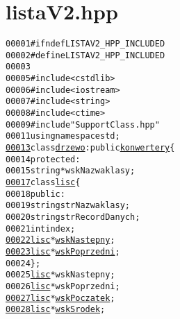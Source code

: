 \hypertarget{listaV2_8hpp_source}{
\section{listaV2.hpp}
}


\begin{footnotesize}\begin{alltt}
00001 \textcolor{preprocessor}{#ifndef LISTAV2\_HPP\_INCLUDED}
00002 \textcolor{preprocessor}{}\textcolor{preprocessor}{#define LISTAV2\_HPP\_INCLUDED}
00003 \textcolor{preprocessor}{}
00005 \textcolor{preprocessor}{#include <cstdlib>}
00006 \textcolor{preprocessor}{#include <iostream>}
00007 \textcolor{preprocessor}{#include <string>}
00008 \textcolor{preprocessor}{#include <ctime>}
00009 \textcolor{preprocessor}{#include "SupportClass.hpp"}
00011 \textcolor{keyword}{using namespace }std;
\hypertarget{listaV2_8hpp_source_l00013}{}\hyperlink{classdrzewo}{00013} \textcolor{keyword}{class }\hyperlink{classdrzewo}{drzewo}:\textcolor{keyword}{public} \hyperlink{classkonwertery}{konwertery}\{
00014     \textcolor{keyword}{protected}:
00015         \textcolor{keywordtype}{string} *wskNazwaklasy;
\hypertarget{listaV2_8hpp_source_l00017}{}\hyperlink{classdrzewo_1_1lisc}{00017}         \textcolor{keyword}{class }\hyperlink{classdrzewo_1_1lisc}{lisc}\{
00018             \textcolor{keyword}{public}:
00019                 \textcolor{keywordtype}{string} strNazwaklasy;
00020                 \textcolor{keywordtype}{string} strRecordDanych;
00021                 \textcolor{keywordtype}{int} index;
\hypertarget{listaV2_8hpp_source_l00022}{}\hyperlink{classdrzewo_1_1lisc_a858c0f3f3ff7295b5cb33f19a1c1f3df}{00022}                 \hyperlink{classdrzewo_1_1lisc}{lisc} *\hyperlink{classdrzewo_1_1lisc_a858c0f3f3ff7295b5cb33f19a1c1f3df}{wskNastepny}; 
\hypertarget{listaV2_8hpp_source_l00023}{}\hyperlink{classdrzewo_1_1lisc_a1b88c992a7e020e4e753f7a5769e99d3}{00023}                 \hyperlink{classdrzewo_1_1lisc}{lisc} *\hyperlink{classdrzewo_1_1lisc_a1b88c992a7e020e4e753f7a5769e99d3}{wskPoprzedni}; 
00024         \};
00025         \hyperlink{classdrzewo_1_1lisc}{lisc} *wskNastepny;
00026         \hyperlink{classdrzewo_1_1lisc}{lisc} *wskPoprzedni;
\hypertarget{listaV2_8hpp_source_l00027}{}\hyperlink{classdrzewo_abf545a65e743e70d70a1947ac35c73d9}{00027}         \hyperlink{classdrzewo_1_1lisc}{lisc} *\hyperlink{classdrzewo_abf545a65e743e70d70a1947ac35c73d9}{wskPoczatek};
\hypertarget{listaV2_8hpp_source_l00028}{}\hyperlink{classdrzewo_acba6bb799cb3d30c63eff67ac2bc2225}{00028}         \hyperlink{classdrzewo_1_1lisc}{lisc} *\hyperlink{classdrzewo_acba6bb799cb3d30c63eff67ac2bc2225}{wskSrodek};

\end{alltt}
\end{footnotesize}
